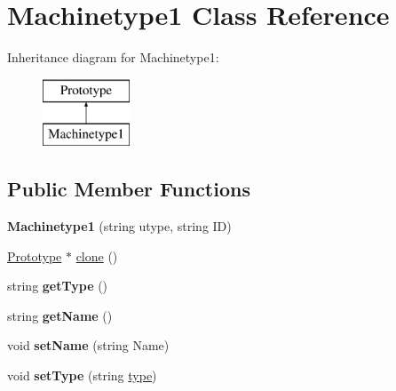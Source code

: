\hypertarget{classMachinetype1}{}\section{Machinetype1 Class Reference}
\label{classMachinetype1}
Inheritance diagram for Machinetype1\+:\begin{figure}[H]
\begin{center}
\leavevmode
\includegraphics[height=2.000000cm]{classMachinetype1}
\end{center}
\end{figure}
\subsection*{Public Member Functions}
\begin{DoxyCompactItemize}
\item 
{\bfseries Machinetype1} (string utype, string ID)\hypertarget{classMachinetype1_a6115ce5e071ca63100700b98cfe74a92}{}\label{classMachinetype1_a6115ce5e071ca63100700b98cfe74a92}

\item 
\hyperlink{classPrototype}{Prototype} $\ast$ \hyperlink{classMachinetype1_a5f2b94ac7f57e3120a5abf21519b3e74}{clone} ()
\item 
string {\bfseries get\+Type} ()\hypertarget{classMachinetype1_a9482930efc9d0bc0bf5c952b723ec526}{}\label{classMachinetype1_a9482930efc9d0bc0bf5c952b723ec526}

\item 
string {\bfseries get\+Name} ()\hypertarget{classMachinetype1_aa2f384411cfaa25d2348fbd6a19f4bee}{}\label{classMachinetype1_aa2f384411cfaa25d2348fbd6a19f4bee}

\item 
void {\bfseries set\+Name} (string Name)\hypertarget{classMachinetype1_a51d81bf04ef5aea0b3083b1389a2659e}{}\label{classMachinetype1_a51d81bf04ef5aea0b3083b1389a2659e}

\item 
void {\bfseries set\+Type} (string \hyperlink{classPrototype_a2d6c59c7f19020c5c66bb1902d858992}{type})\hypertarget{classMachinetype1_ae6639a21253034a2d73cfccc20b04f47}{}\label{classMachinetype1_ae6639a21253034a2d73cfccc20b04f47}

\end{DoxyCompactItemize}
